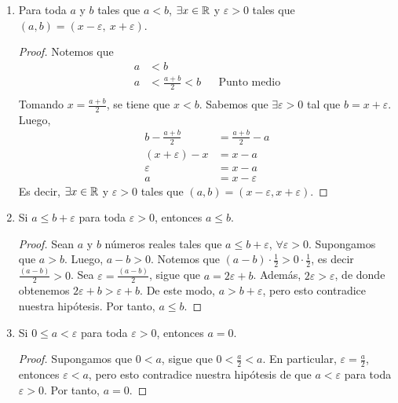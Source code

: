 \begin{enumerate}[label=\alph*)]
\clearpage\pagebreak
  
  \item Para toda $a$ y $b$ tales que $a<b$, $\exists x\in \mathbb{R}$ y $\varepsilon>0$ tales que $(a, b)= (x- \varepsilon, \ x+\varepsilon)$.
  \begin{proof}\leavevmode
    Notemos que
    \begin{align*}
      a &< b\\
      a &< \frac{a+b}{2} < b && \text{Punto medio}\\
    \end{align*}
    Tomando $x=\frac{a+b}{2}$, se tiene que $x<b$. Sabemos que $\exists \varepsilon>0$ tal que $b=x+\varepsilon$. Luego,
    \begin{align*}
      b-\frac{a+b}{2} &= \frac{a+b}{2}-a\\
      (x+\varepsilon) - x &= x - a\\
      \varepsilon &= x - a\\
      a &= x - \varepsilon
    \end{align*}
    Es decir, $\exists x\in \mathbb{R}$ y $\varepsilon>0$ tales que $(a, b)= (x- \varepsilon, x+\varepsilon)$.
  \end{proof}
    
  \item Si $a \leq b + \varepsilon$ para toda $\varepsilon > 0$, entonces $a \leq b$.
 
  \begin{proof} 
   Sean $a$ y $b$ números reales tales que $a \leq b + \varepsilon$, $\forall \varepsilon > 0$. Supongamos que $a > b$. Luego, $a-b>0$. Notemos que $(a-b) \cdot \frac{1}{2} > 0 \cdot \frac{1}{2}$, es decir $\frac{(a-b)}{2} > 0$. Sea $\varepsilon = \frac{(a-b)}{2}$, sigue que $a=2\varepsilon+b$. Además, $2\varepsilon > \varepsilon$, de donde obtenemos $2 \varepsilon + b > \varepsilon + b$. De este modo, $a > b+\varepsilon$, pero esto contradice nuestra hipótesis. Por tanto, $a \leq b$. 
  \end{proof}
  
 \item Si $0 \leq a < \varepsilon$ para toda $\varepsilon > 0$, entonces $a=0$.
 
 \begin{proof} 
  Supongamos que $0<a$, sigue que $0<\frac{a}{2}<a$. En particular, $\varepsilon=\frac{a}{2}$, entonces $\varepsilon<a$, pero esto contradice nuestra hipótesis de que $a< \varepsilon$ para toda $\varepsilon>0$. Por tanto, $a=0$. 
 \end{proof}


\end{enumerate}
